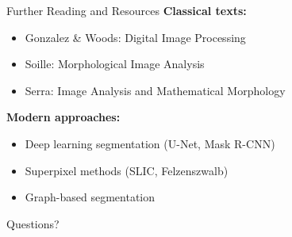 \documentclass[aspectratio=169,10pt]{beamer}
\begin{document}
\begin{frame}{Further Reading and Resources}
\textbf{Classical texts:}
\begin{itemize}
\item Gonzalez \& Woods: Digital Image Processing
\item Soille: Morphological Image Analysis
\item Serra: Image Analysis and Mathematical Morphology
\end{itemize}

\textbf{Modern approaches:}
\begin{itemize}
\item Deep learning segmentation (U-Net, Mask R-CNN)
\item Superpixel methods (SLIC, Felzenszwalb)
\item Graph-based segmentation
\end{itemize}
\end{frame}

\begin{frame}[standout]
Questions?
\end{frame}
\end{document}
